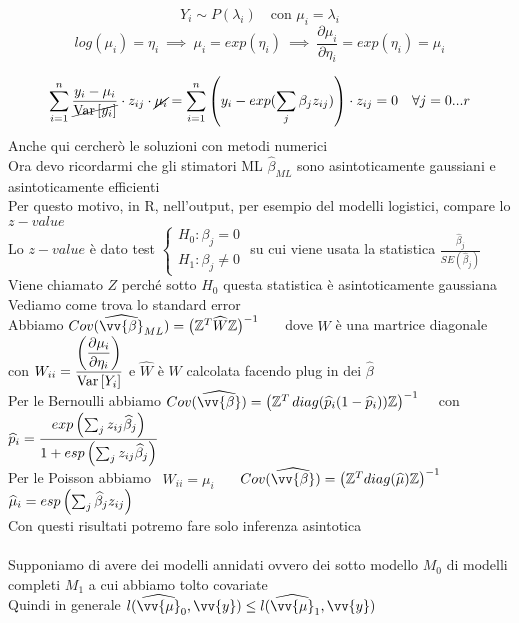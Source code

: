 \[
Y_i\sim P(\lambda_i) \ \ \ \text{ con } \mu_i=\lambda_i
\]
\[
log(\mu_i)=\eta_i \ \implies \ \mu_i=exp(\eta_i) \ \implies \ \frac{\partial\mu_i}{\partial\eta_i} = exp(\eta_i)=\mu_i
\]

\[
\sum\limits_{i=1}^{n}\dfrac{y_i-\mu_i}{\cancel{\text{Var} \left[ y_i \right]}}\cdot z_{ij}\cdot \cancel{\mu_i} = \sum\limits_{i=1}^{n} \left( y_i-exp(\sum_j \beta_jz_{ij}) \right)\cdot z_{ij}=0 \ \ \ \forall j=0...r
\]
Anche qui cercherò le soluzioni con metodi numerici\\

Ora devo ricordarmi che gli stimatori ML $\hat{\beta}_{ML}$ sono asintoticamente gaussiani e asintoticamente efficienti\\
Per questo motivo, in R,  nell'output, per esempio del modelli logistici, compare lo $z-value$\\


Lo $z-value$ è dato test $\begin{cases}
    H_0 : \beta_j=0\\
    H_1 : \beta_j\ne 0
\end{cases}$ su cui viene usata la statistica $\frac{\hat{\beta}_j}{SE(\hat{\beta}_j)}$\\
Viene chiamato $Z$ perché sotto $H_0$ questa statistica è asintoticamente gaussiana\\


Vediamo come trova lo standard error\\
Abbiamo $Cov(\hat{\vv{\beta}}_{ML}) = \big(\ZZ^T \hat{W} \ZZ\big)^{-1}$ \ \ \ dove $W$ è una martrice diagonale con $W_{ii}=\dfrac{\left(\dfrac{\partial \mu_i}{\partial\eta_i}\right)}{\text{Var} \left[ Y_i \right]}$ e $\hat{W}$ è $W$ calcolata facendo plug in dei $\hat{\beta}$\\

Per le Bernoulli abbiamo $Cov(\hat{\vv{\beta}})=\O\ZZ^T \, diag(\hat{p}_i(1-\hat{p}_i))\ZZ\C^{-1}$ \ \ con  $\widehat{p}_i = \dfrac{exp\left(\sum_j z_{ij}\widehat{\beta}_j\right)}{1+esp\left(\sum_j z_{ij}\widehat{\beta}_j\right)}$\\

Per le Poisson abbiamo \ $W_{ii}=\mu_i$ \ \ \ $Cov(\hat{\vv{\beta}})=\O\ZZ^T diag(\hat{\mu})\ZZ\C^{-1}$ \ \ \ $\widehat{\mu}_i= esp\left(\sum_j \widehat{\beta}_jz_{ij}\right)$\\

Con questi risultati potremo fare solo inferenza asintotica\\ \\


Supponiamo di avere dei modelli annidati ovvero dei sotto modello $M_0$ di modelli completi $M_1$ a cui abbiamo tolto covariate\\
Quindi in generale $l(\hat{\vv{\mu}}_0,\vv{y})\le l(\hat{\vv{\mu}}_1,\vv{y})$

